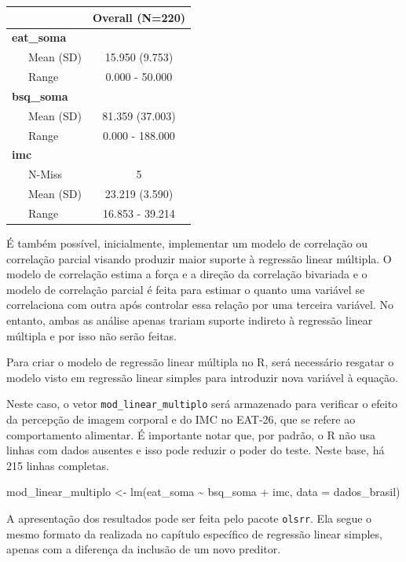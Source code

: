 \documentclass[
]{book}
\newenvironment{Shaded}{\begin{snugshade}}{\end{snugshade}}
\newcommand{\AttributeTok}[1]{\textcolor[rgb]{0.77,0.63,0.00}{#1}}
\newcommand{\FunctionTok}[1]{\textcolor[rgb]{0.00,0.00,0.00}{#1}}
\newcommand{\NormalTok}[1]{#1}
\newcommand{\OtherTok}[1]{\textcolor[rgb]{0.56,0.35,0.01}{#1}}
\newcommand{\SpecialCharTok}[1]{\textcolor[rgb]{0.00,0.00,0.00}{#1}}
\begin{document}
\begin{longtable}[]{@{}lc@{}}
\toprule
& Overall (N=220) \\
\midrule
\endhead
\textbf{eat\_soma} & \\
~~~Mean (SD) & 15.950 (9.753) \\
~~~Range & 0.000 - 50.000 \\
\textbf{bsq\_soma} & \\
~~~Mean (SD) & 81.359 (37.003) \\
~~~Range & 0.000 - 188.000 \\
\textbf{imc} & \\
~~~N-Miss & 5 \\
~~~Mean (SD) & 23.219 (3.590) \\
~~~Range & 16.853 - 39.214 \\
\bottomrule
\end{longtable}

É também possível, inicialmente, implementar um modelo de correlação ou correlação parcial visando produzir maior suporte à regressão linear múltipla. O modelo de correlação estima a força e a direção da correlação bivariada e o modelo de correlação parcial é feita para estimar o quanto uma variável se correlaciona com outra após controlar essa relação por uma terceira variável. No entanto, ambas as análise apenas trariam suporte indireto à regressão linear múltipla e por isso não serão feitas.

Para criar o modelo de regressão linear múltipla no R, será necessário resgatar o modelo visto em regressão linear simples para introduzir nova variável à equação.

Neste caso, o vetor \texttt{mod\_linear\_multiplo} será armazenado para verificar o efeito da percepção de imagem corporal e do IMC no EAT-26, que se refere ao comportamento alimentar. É importante notar que, por padrão, o R não usa linhas com dados ausentes e isso pode reduzir o poder do teste. Neste base, há 215 linhas completas.

\begin{Shaded}
\begin{Highlighting}[]
\NormalTok{mod\_linear\_multiplo }\OtherTok{\textless{}{-}} \FunctionTok{lm}\NormalTok{(eat\_soma }\SpecialCharTok{\textasciitilde{}}\NormalTok{ bsq\_soma }\SpecialCharTok{+}\NormalTok{ imc, }\AttributeTok{data =}\NormalTok{ dados\_brasil)}
\end{Highlighting}
\end{Shaded}

A apresentação dos resultados pode ser feita pelo pacote \texttt{olsrr}. Ela segue o mesmo formato da realizada no capítulo específico de regressão linear simples, apenas com a diferença da inclusão de um novo preditor.
\end{document}
